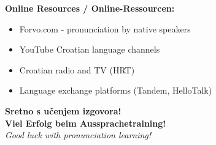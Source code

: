 \textbf{Online Resources / Online-Ressourcen:}
\begin{itemize}
    \item Forvo.com - pronunciation by native speakers
    \item YouTube Croatian language channels
    \item Croatian radio and TV (HRT)
    \item Language exchange platforms (Tandem, HelloTalk)
\end{itemize}

\vspace{1cm}

\begin{center}
\textbf{\Large Sretno s učenjem izgovora!}\\
\textbf{\Large Viel Erfolg beim Aussprachetraining!}\\
\vspace{0.5cm}
\textit{Good luck with pronunciation learning!}
\end{center}
